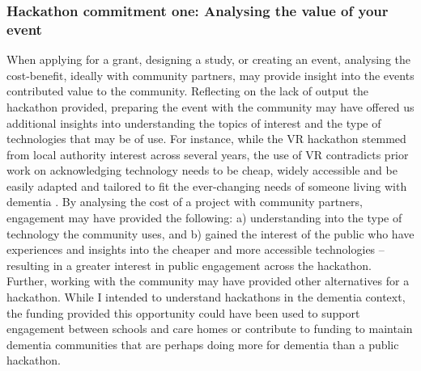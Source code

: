 \subsubsection{Hackathon commitment one: Analysing the value of your event}
\label{DiscussionThree:CommitOne}
When applying for a grant, designing a study, or creating an event, analysing the cost-benefit, ideally with community partners, may provide insight into the events contributed value to the community. Reflecting on the lack of output the hackathon provided, preparing the event with the community may have offered us additional insights into understanding the topics of interest and the type of technologies that may be of use. For instance, while the VR hackathon stemmed from local authority interest across several years, the use of VR contradicts prior work on acknowledging technology needs to be cheap, widely accessible and be easily adapted and tailored to fit the ever-changing needs of someone living with dementia \citep{lorenz2019technology}. By analysing the cost of a project with community partners, engagement may have provided the following: a) understanding into the type of technology the community uses, and b) gained the interest of the public who have experiences and insights into the cheaper and more accessible technologies – resulting in a greater interest in public engagement across the hackathon. Further, working with the community may have provided other alternatives for a hackathon. While I intended to understand hackathons in the dementia context, the funding provided this opportunity could have been used to support engagement between schools and care homes or contribute to funding to maintain dementia communities that are perhaps doing more for dementia than a public hackathon.

